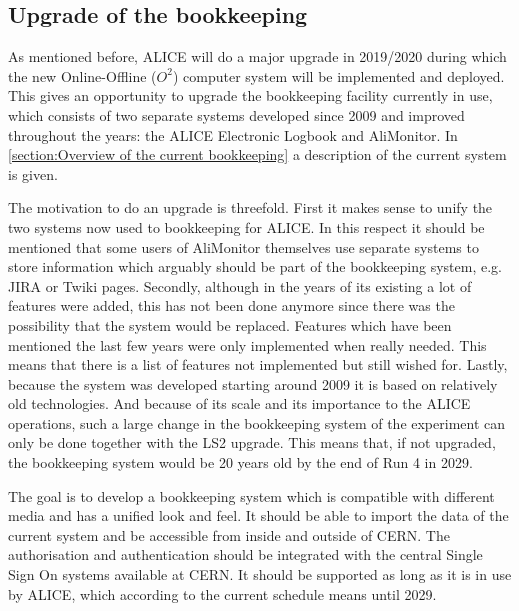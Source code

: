 \subsection{Upgrade of the bookkeeping}
As mentioned before, ALICE will do a major upgrade in 2019/2020 during which the new Online-Offline ($O^2$) computer system will be implemented and deployed. This gives an opportunity to upgrade the bookkeeping facility currently in use, which consists of two separate systems developed since 2009 and improved throughout the years: the ALICE Electronic Logbook and AliMonitor. In \ref{section:Overview of the current bookkeeping} a description of the current system is given. 

The motivation to do an upgrade is threefold. First it makes sense to unify the two systems now used to bookkeeping for ALICE. In this respect it should be mentioned that some users of AliMonitor themselves use separate systems to store information which arguably should be part of the bookkeeping system, e.g. JIRA or Twiki pages. Secondly, although in the years of its existing a lot of features were added, this has not been done anymore since there was the possibility that the system would be replaced. Features which have been mentioned the last few years were only implemented when really needed. This means that there is a list of features not implemented but still wished for. Lastly, because the system was developed starting around 2009 it is based on relatively old technologies. And because of its scale and its importance to the ALICE operations, such a large change in the bookkeeping system of the experiment can only be done together with the LS2 upgrade. This means that, if not upgraded, the bookkeeping system would be 20 years old by the end of Run 4 in 2029.

The goal is to develop a bookkeeping system which is compatible with different media and has a unified look and feel. It should be able to import the data of the current system and be accessible from inside and outside of CERN. The authorisation and authentication should be integrated with the central Single Sign On systems available at CERN. It should be supported as long as it is in use by ALICE, which according to the current schedule means until 2029.

